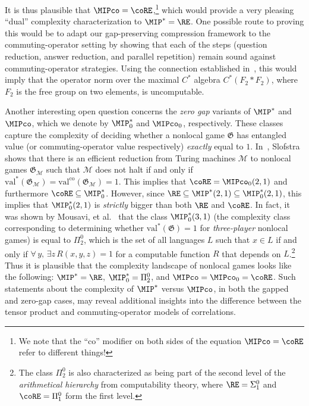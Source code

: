 \documentclass[11pt]{article}
\theoremstyle{definition}
\newcommand{\val}{\ensuremath{\mathrm{val}}}
\newcommand{\valco}{\ensuremath{\mathrm{val}^{\mathrm{co}}}}
\newcommand{\game}{\mathfrak{G}}
\newcommand{\machine}{\cal{M}}
\renewcommand{\cal}[1]{\mathcal{#1}}
\begin{document}
It is thus plausible that $\MIPco = \coRE$,\footnote{We note that the ``co'' modifier on both sides of the equation $\MIPco = \coRE$ refer to different things!} which would provide a very pleasing ``dual'' complexity characterization to $\MIP^* = \RE$. One possible route to proving this would be to adapt our gap-preserving compression framework to the commuting-operator setting by showing that each of the steps (question reduction, answer reduction, and parallel repetition) remain sound against commuting-operator strategies. Using the connection established in~\cite{fritz2014can}, this would imply that the operator norm over the maximal $C^*$ algebra $C^*(F_2 * F_2)$, where $F_2$ is the free group on two elements, is uncomputable. 

Another interesting open question concerns the \emph{zero gap} variants of $\MIP^*$ and $\MIPco$, which we denote by $\MIP^*_0$ and $\MIPco_0$, respectively. These classes capture the complexity of deciding whether a nonlocal game $\game$ has entangled value (or commuting-operator value respectively) \emph{exactly} equal to $1$. In~\cite{slofstra2019set}, Slofstra shows that there is an efficient reduction from Turing machines $\cal{M}$ to nonlocal games $\game_\machine$ such that $\machine$ does not halt if and only if $\val^*(\game_\machine) = \valco(\game_\machine) = 1$. This implies that $\coRE = \MIPco_0(2,1)$ and furthermore $\coRE \subseteq \MIP^*_0$. However, since $\RE \subseteq \MIP^*(2,1) \subseteq \MIP^*_0(2,1)$, this implies that $\MIP^*_0(2,1)$ is \emph{strictly} bigger than both $\RE$ and $\coRE$. In fact, it was shown by Mousavi, et al.~\cite{mousavi2020complexity} that the class $\MIP^*_0(3,1)$ (the complexity class corresponding to determining whether $\val^*(\game) = 1$ for \emph{three-player} nonlocal games) is equal to $\Pi_2^0$, which is the set of all languages $L$ such that $x \in L$ if and only if $\forall\, y, \, \exists z \, R(x,y,z) = 1$ for a computable function $R$ that depends on $L$.\footnote{The class $\Pi_2^0$ is also characterized as being part of the second level of the \emph{arithmetical hierarchy} from computability theory, where $\RE = \Sigma_1^0$ and $\coRE = \Pi_1^0$ form the first level.} Thus it is plausible that the complexity landscape of nonlocal games looks like the following: $\MIP^* = \RE$, $\MIP^*_0 = \Pi_2^0$, and $\MIPco = \MIPco_0 = \coRE$. Such statements about the complexity of $\MIP^*$ versus $\MIPco$, in both the gapped and zero-gap cases, may reveal additional insights into the difference between the tensor product and commuting-operator models of correlations.
\end{document}
